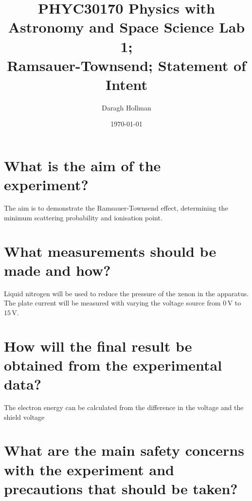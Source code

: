 \documentclass[%
reprint,
amsmath,amssymb,
aps,
]{revtex4-2}
\begin{document}
	\title{PHYC30170 Physics with Astronomy and Space Science Lab 1;\\
	Ramsauer-Townsend; Statement of Intent}
	
	\author{Daragh Hollman}
	
	\date{\today}
	
	\maketitle
	
	\onecolumngrid
	\section{What is the aim of the experiment?}
		The aim is to demonstrate the Ramsauer-Townsend effect, determining the minimum scattering probability and ionisation point.
	
	\section{What measurements should be made and how?}
		Liquid nitrogen will be used to reduce the pressure of the xenon in the apparatus. The plate current will be measured  with varying the voltage source from $0 \,\text{V}$ to $15 \,\text{V}$.
	
	\section{How will the final result be obtained from the experimental data?}
		The electron energy can be calculated from the difference in the voltage and the shield voltage
	
	\section{What are the main safety concerns with the experiment and precautions that should be taken?}
		
	
\end{document}
